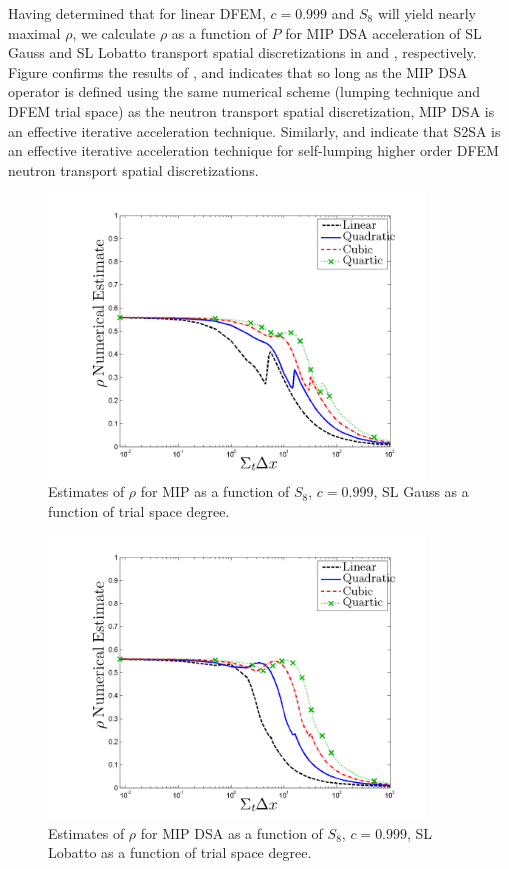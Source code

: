 Having determined that for linear DFEM, $c=0.999$ and $S_8$ will yield nearly maximal $\rho$, we calculate $\rho$ as a function of $P$ for MIP DSA acceleration of SL Gauss and SL Lobatto transport spatial discretizations in  and , respectively.  Figure  confirms the results of \cite{mip_dsa}, and  indicates that so long as the MIP DSA operator is defined using the same numerical scheme (lumping technique and DFEM trial space) as the neutron transport spatial discretization, MIP DSA is an effective iterative acceleration technique.
Similarly,  and  indicate that S2SA is an effective iterative acceleration technique for self-lumping higher order DFEM neutron transport spatial discretizations.
\vfill{}
\begin{figure}[!htp]
\centering
\includegraphics[width=10cm]{chapter4_acceleration/Constant_XS_SN8_MIP_Gauss.png}
\caption{Estimates of $\rho$ for MIP as a function of $S_8$, $c=0.999$, SL Gauss as a function of trial space degree.}
\label{fig:mip_gauss}
\end{figure}
%
%
\begin{figure}[!hbp]
\centering
\includegraphics[width=10cm]{chapter4_acceleration/Constant_XS_SN8_MIP_Lobatto.png}
\caption{Estimates of $\rho$ for MIP DSA as a function of $S_8$, $c=0.999$, SL Lobatto as a function of trial space degree.}
\label{fig:mip_lobatto}
\end{figure}
